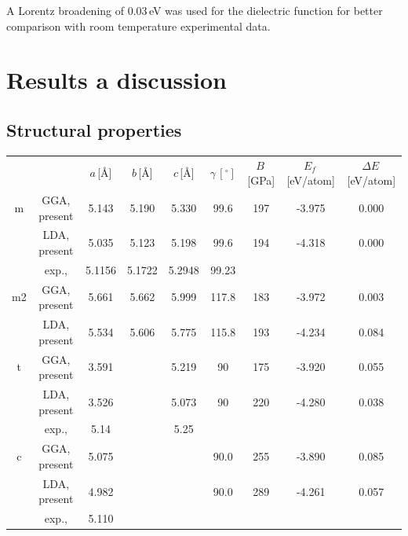 \documentclass[10pt,a4paper,twocolumn]{article}
\begin{document}
A Lorentz broadening of 0.03\,eV was used for the dielectric function for better comparison with room temperature experimental data.

\section{Results a discussion}

\subsection{Structural properties}

\begin{table}
\begin{center}
\begin{tabular}{ccccccccc}

 & & $a$\,[\AA] & $b$\,[\AA] & $c$\,[\AA] & $\gamma\,[^{\circ}]$ &
$B$\,[GPa] & $E_f$\,[eV/atom] & $\Delta E$\,[eV/atom]\\
m & GGA, present & 5.143 & 5.190 & 5.330 & 99.6 & 197 & -3.975 & 0.000
\\%
  & LDA, present & 5.035 & 5.123 & 5.198 & 99.6 & 194 & -4.318 & 0.000
\\%
  & exp., \citet{Adam1959} & 5.1156 & 5.1722 & 5.2948 & 99.23 & & & \\

m2 & GGA, present & 5.661 & 5.662 & 5.999 & 117.8 & 183 & -3.972 &
0.003\\ %
   & LDA, present & 5.534 & 5.606 & 5.775 & 115.8 & 193 & -4.234 &
0.084\\ %

t & GGA, present & 3.591 & & 5.219 & 90 & 175 & -3.920 & 0.055\\ %
  & LDA, present & 3.526 & & 5.073 & 90 & 220 & -4.280 & 0.038\\ %
  & exp., \citet{Curtis1954} & 5.14 & & 5.25 & & & & \\

c & GGA, present & 5.075 & & & 90.0 & 255 & -3.890 & 0.085 \\%
  & LDA, present & 4.982 & & & 90.0 & 289 & -4.261 & 0.057 \\%
  & exp., \citet{Senft1983} & 5.110 & & & & & & \\


\end{tabular}
\end{center}
\end{table}
\end{document}

